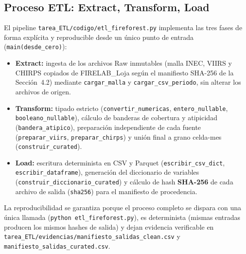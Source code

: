 \documentclass[11pt,a4paper]{article}
\begin{document}
\subsection{Proceso ETL: Extract, Transform, Load}
El pipeline \texttt{tarea\_ETL/codigo/etl\_fireforest.py} implementa las tres fases de forma expl\'icita y reproducible desde un \'unico punto de entrada (\texttt{main(desde\_cero)}):
\begin{itemize}
    \item \textbf{Extract:} ingesta de los archivos Raw inmutables (malla INEC, VIIRS y CHIRPS copiados de FIRELAB\_Loja seg\'un el manifiesto SHA-256 de la Secci\'on~4.2) mediante \texttt{cargar\_malla} y \texttt{cargar\_csv\_periodo}, sin alterar los archivos de origen.
    \item \textbf{Transform:} tipado estricto (\texttt{convertir\_numericas}, \texttt{entero\_nullable}, \texttt{booleano\_nullable}), c\'alculo de banderas de cobertura y atipicidad (\texttt{bandera\_atipico}), preparaci\'on independiente de cada fuente (\texttt{preparar\_viirs}, \texttt{preparar\_chirps}) y uni\'on final a grano celda-mes (\texttt{construir\_curated}).
    \item \textbf{Load:} escritura determinista en CSV y Parquet (\texttt{escribir\_csv\_dict}, \texttt{escribir\_dataframe}), generaci\'on del diccionario de variables (\texttt{construir\_diccionario\_curated}) y c\'alculo de hash \textbf{SHA-256} de cada archivo de salida (\texttt{sha256}) para el manifiesto de procedencia.
\end{itemize}
La reproducibilidad se garantiza porque el proceso completo se dispara con una \'unica llamada (\texttt{python etl\_fireforest.py}), es determinista (mismas entradas producen los mismos hashes de salida) y dejan evidencia verificable en \texttt{tarea\_ETL/evidencias/manifiesto\_salidas\_clean.csv} y \texttt{manifiesto\_salidas\_curated.csv}.
\end{document}
